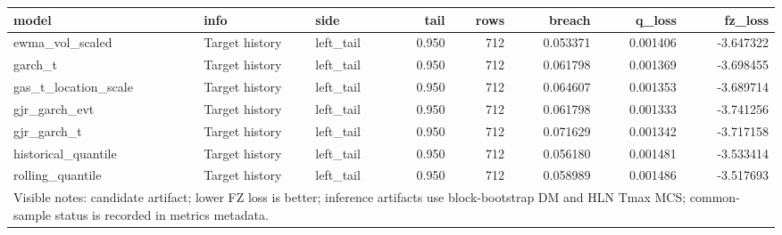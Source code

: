 \begin{tabular}{lllrrrrr}
\toprule
model & info & side & tail & rows & breach & q_loss & fz_loss \\
\midrule
ewma\_vol\_scaled & Target history & left\_tail & 0.950 & 712 & 0.053371 & 0.001406 & -3.647322 \\
garch\_t & Target history & left\_tail & 0.950 & 712 & 0.061798 & 0.001369 & -3.698455 \\
gas\_t\_location\_scale & Target history & left\_tail & 0.950 & 712 & 0.064607 & 0.001353 & -3.689714 \\
gjr\_garch\_evt & Target history & left\_tail & 0.950 & 712 & 0.061798 & 0.001333 & -3.741256 \\
gjr\_garch\_t & Target history & left\_tail & 0.950 & 712 & 0.071629 & 0.001342 & -3.717158 \\
historical\_quantile & Target history & left\_tail & 0.950 & 712 & 0.056180 & 0.001481 & -3.533414 \\
rolling\_quantile & Target history & left\_tail & 0.950 & 712 & 0.058989 & 0.001486 & -3.517693 \\
\midrule
\multicolumn{8}{l}{\footnotesize Visible notes: candidate artifact; lower FZ loss is better; inference artifacts use block-bootstrap DM and HLN Tmax MCS; common-sample status is recorded in metrics metadata.} \\
\bottomrule
\end{tabular}
